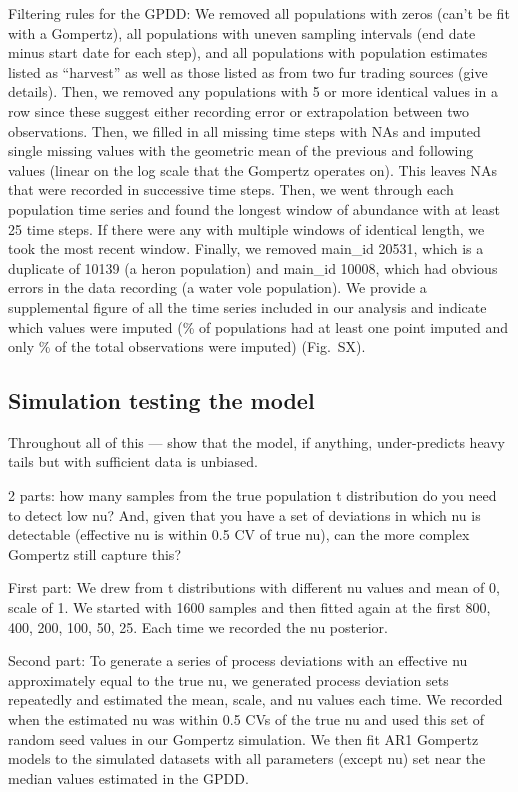 \documentclass[10pt]{article}
\begin{document}
Filtering rules for the GPDD:
We removed all populations with zeros (can't be fit with a Gompertz), all populations with uneven sampling intervals (end date minus start date for each step), and all populations with population estimates listed as ``harvest'' as well as those listed as from two fur trading sources (give details).
Then, we removed any populations with 5 or more identical values in a row since these suggest either recording error or extrapolation between two observations.
Then, we filled in all missing time steps with NAs and imputed single missing values with the geometric mean of the previous and following values (linear on the log scale that the Gompertz operates on). This leaves NAs that were recorded in successive time steps.
Then, we went through each population time series and found the longest window of abundance with at least 25 time steps. If there were any with multiple windows of identical length, we took the most recent window.
Finally, we removed main\_id 20531, which is a duplicate of 10139 (a heron population) and main\_id 10008, which had obvious errors in the data recording (a water vole population). We provide a supplemental figure of all the time series included in our analysis and indicate which values were imputed (\percImputedPops\% of populations had at least one point imputed and only \percImputedPoints\% of the total observations were imputed) (Fig.\ SX).


\subsection*{Simulation testing the model}

Throughout all of this --- show that the model, if anything, under-predicts heavy tails but with sufficient data is unbiased.

2 parts: how many samples from the true population t distribution do you need to detect low nu? And, given that you have a set of deviations in which nu is detectable (effective nu is within 0.5 CV of true nu), can the more complex Gompertz still capture this?

First part: We drew from t distributions with different nu values and mean of 0, scale of 1. We started with 1600 samples and then fitted again at the first 800, 400, 200,  100, 50, 25. Each time we recorded the nu posterior.

Second part: To generate a series of process deviations with an effective nu approximately equal to the true nu, we generated process deviation sets repeatedly and estimated the mean, scale, and nu values each time. We recorded when the estimated nu was within 0.5 CVs of the true nu and used this set of random seed values in our Gompertz simulation. We then fit AR1 Gompertz models to the simulated datasets with all parameters (except nu) set near the median values estimated in the GPDD.
\end{document}
